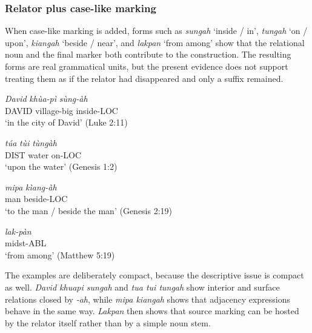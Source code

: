 \documentclass[
  11pt,
  a4paper,
]{article}
\newcommand{\tdim}[1]{\textit{#1}}
\newcommand{\tdimword}[1]{\textit{#1}}
\renewcommand{\textsc}[1]{{\footnotesize\MakeUppercase{#1}}}
\newcommand{\glossquote}[1]{`#1'}
\begin{document}
\subsubsection{Relator plus case-like
marking}\label{relator-plus-case-like-marking}

When case-like marking is added, forms such as \tdim{sungah}
\glossquote{inside / in}, \tdim{tungah} \glossquote{on / upon},
\tdim{kiangah} \glossquote{beside / near}, and \tdim{lakpan}
\glossquote{from among} show that the relational noun and the final
marker both contribute to the construction. The resulting forms are real
grammatical units, but the present evidence does not support treating
them as if the relator had disappeared and only a suffix remained.

\begin{exe}
\ex \label{ex:rel-sungah-david-khuapi}
\gll \tdimword{David} \tdimword{khùa-pì} \tdimword{sùng-àh} \\
     \textsc{david} village-big inside-\textsc{loc} \\
\glt \glossquote{in the city of David} (Luke 2:11)
\end{exe}

\begin{exe}
\ex \label{ex:rel-tungah-tua-tui}
\gll \tdimword{túa} \tdimword{tùi} \tdimword{tùngàh} \\
     \textsc{dist} water on-\textsc{loc} \\
\glt \glossquote{upon the water} (Genesis 1:2)
\end{exe}

\begin{exe}
\ex \label{ex:rel-kiangah-mipa}
\gll \tdimword{mipa} \tdimword{kìang-àh} \\
     man beside-\textsc{loc} \\
\glt \glossquote{to the man / beside the man} (Genesis 2:19)
\end{exe}

\begin{exe}
\ex \label{ex:rel-lakpan}
\gll \tdimword{lak-pàn} \\
     midst-\textsc{abl} \\
\glt \glossquote{from among} (Matthew 5:19)
\end{exe}

The examples are deliberately compact, because the descriptive issue is
compact as well. \tdim{David khuapi sungah} and \tdim{tua tui tungah}
show interior and surface relations closed by \tdim{-ah}, while
\tdim{mipa kiangah} shows that adjacency expressions behave in the same
way. \tdim{Lakpan} then shows that source marking can be hosted by the
relator itself rather than by a simple noun stem.
\end{document}
